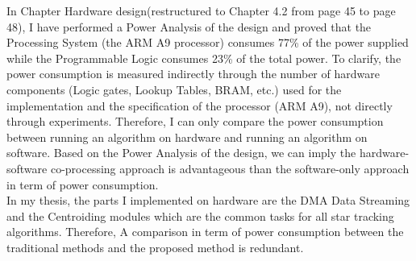 \documentclass[dvips,a4paper,12pt]{article}
\begin{document}
\begin{enumerate}
    \color{black}
    In Chapter Hardware design(restructured to Chapter 4.2 from page 45 to page 48), I have performed a Power Analysis of the design and proved that the Processing System (the ARM A9 processor) consumes 77\% of the power supplied while the Programmable Logic consumes 23\% of the total power. To clarify, the power consumption is measured indirectly through the number of hardware components (Logic gates, Lookup Tables, BRAM, etc.) used for the implementation and the specification of the processor (ARM A9), not directly through experiments. Therefore, I can only compare the power consumption between running an algorithm on hardware and running an algorithm on software. Based on the Power Analysis of the design, we can imply the hardware-software co-processing approach is advantageous than the software-only approach in term of power consumption. \\
    In my thesis, the parts I implemented on hardware are the DMA Data Streaming and the Centroiding modules which are the common tasks for all star tracking algorithms. Therefore, A comparison in term of power consumption between the traditional methods and the proposed method is redundant.

\end{enumerate}

\color{black}



\end{document}
